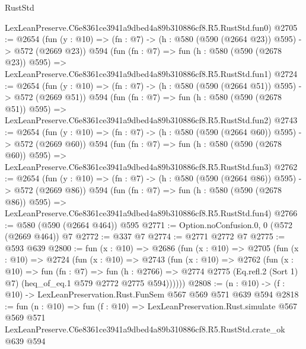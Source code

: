 \begin{lexlean}{RustStd}
\begin{coremodule}
    LexLeanPreserve.C6e8361ce3941a9dbed4a89b310886cf8.R5.RustStd.fun0)
@2705 := @2654
    (fun (y : @10) => (fn : @7) -> (h : @580 (@590 (@2664 @23)) @595) -> @572 (@2669 @23))
    @594
    (fun (fn : @7) =>
    fun (h : @580 (@590 (@2678 @23)) @595) =>
    LexLeanPreserve.C6e8361ce3941a9dbed4a89b310886cf8.R5.RustStd.fun1)
@2724 := @2654
    (fun (y : @10) => (fn : @7) -> (h : @580 (@590 (@2664 @51)) @595) -> @572 (@2669 @51))
    @594
    (fun (fn : @7) =>
    fun (h : @580 (@590 (@2678 @51)) @595) =>
    LexLeanPreserve.C6e8361ce3941a9dbed4a89b310886cf8.R5.RustStd.fun2)
@2743 := @2654
    (fun (y : @10) => (fn : @7) -> (h : @580 (@590 (@2664 @60)) @595) -> @572 (@2669 @60))
    @594
    (fun (fn : @7) =>
    fun (h : @580 (@590 (@2678 @60)) @595) =>
    LexLeanPreserve.C6e8361ce3941a9dbed4a89b310886cf8.R5.RustStd.fun3)
@2762 := @2654
    (fun (y : @10) => (fn : @7) -> (h : @580 (@590 (@2664 @86)) @595) -> @572 (@2669 @86))
    @594
    (fun (fn : @7) =>
    fun (h : @580 (@590 (@2678 @86)) @595) =>
    LexLeanPreserve.C6e8361ce3941a9dbed4a89b310886cf8.R5.RustStd.fun4)
@2766 := @580 (@590 (@2664 @464)) @595
@2771 := Option.noConfusion.{0, 0} (@572 (@2669 @464)) @7
@2772 := @337 @7
@2774 := @2771 @2772 @7
@2775 := @593 @639
@2800 := fun (x : @10) =>
  @2686
    (fun (x : @10) =>
    @2705
      (fun (x : @10) =>
      @2724
        (fun (x : @10) =>
        @2743
          (fun (x : @10) =>
          @2762
            (fun (x : @10) =>
            fun (fn : @7) =>
            fun (h : @2766) =>
            @2774 @2775 (Eq.refl.{2} (Sort 1) @7) (heq_of_eq.{1} @579 @2772 @2775 @594))))))
@2808 := (n : @10) -> (f : @10) -> LexLeanPreservation.Rust.FunSem @567 @569 @571 @639 @594
@2818 := fun (n : @10) =>
  fun (f : @10) =>
  LexLeanPreservation.Rust.simulate
    @567
    @569
    @571
    LexLeanPreserve.C6e8361ce3941a9dbed4a89b310886cf8.R5.RustStd.crate_ok
    @639
    @594
\end{coremodule}
\end{lexlean}
